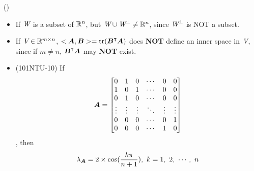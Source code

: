 \begin{theorem}{()}
\begin{itemize}
        \item If $\textit{W}$ is a subset of $\mathbb{R}^n$, but $\textit{W} \cup \textit{W}^\perp \neq \mathbb{R}^n$, since $\textit{W}^\perp$ is NOT a subset.
        \item If $\textit{V} \in \mathbb{R}^{m \times n}$, $<\boldsymbol{A}, \boldsymbol{B}> = \operatorname{tr}(\boldsymbol{B}^\intercal\boldsymbol{A})$ does \textbf{NOT} define an inner space in $\textit{V}$, since if $m \neq n$, $\boldsymbol{B}^\intercal\boldsymbol{A}$ may \textbf{NOT} exist.
        \item (101NTU-10) If \begin{equation}
            \boldsymbol{A} = 
            \begin{bmatrix} 
				0 & 1 & 0 & \cdots & 0 & 0 \\
                1 & 0 & 1 & \cdots & 0 & 0 \\
                0 & 1 & 0 & \cdots & 0 & 0 \\
                \vdots & \vdots & \vdots & \ddots & \vdots & \vdots \\
                0 & 0 & 0 & \cdots & 0 & 1 \\
                0 & 0 & 0 & \cdots & 1 & 0
			\end{bmatrix}
        \end{equation}, then \begin{equation}
            \lambda_{\boldsymbol{A}} = 2 \times \cos(\frac{k\pi}{n + 1}), \ k = 1,\ 2, \ \cdots, \ n
        \end{equation}
    \end{itemize}
\end{theorem}